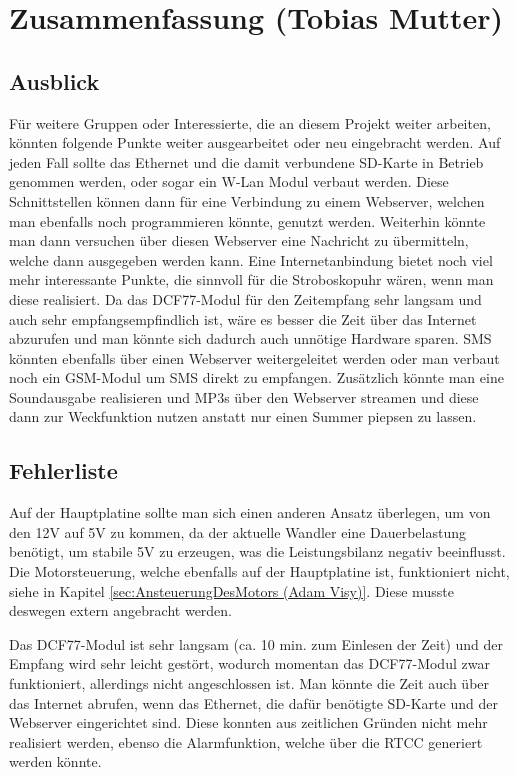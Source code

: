 \chapter{Zusammenfassung (Tobias Mutter)}

\section{Ausblick}

Für weitere Gruppen oder Interessierte, die an diesem Projekt weiter arbeiten, könnten folgende Punkte weiter ausgearbeitet oder neu eingebracht werden. Auf jeden Fall sollte das Ethernet und die damit verbundene SD-Karte in Betrieb genommen werden, oder sogar ein W-Lan Modul verbaut werden. Diese Schnittstellen können dann für eine Verbindung zu einem Webserver, welchen man ebenfalls noch programmieren könnte, genutzt werden. Weiterhin könnte man dann versuchen über diesen Webserver eine Nachricht zu übermitteln, welche dann ausgegeben werden kann. Eine Internetanbindung bietet noch viel mehr interessante Punkte, die sinnvoll für die Stroboskopuhr wären, wenn man diese realisiert. Da das DCF77-Modul für den Zeitempfang sehr langsam und auch sehr empfangsempfindlich ist, wäre es besser die Zeit über das Internet abzurufen und man könnte sich dadurch auch unnötige Hardware sparen. SMS könnten ebenfalls über einen Webserver weitergeleitet werden oder man verbaut noch ein GSM-Modul um SMS direkt zu empfangen. Zusätzlich könnte man eine Soundausgabe realisieren und MP3s über den Webserver streamen und diese dann zur Weckfunktion nutzen anstatt nur einen Summer piepsen zu lassen.
   

\section{Fehlerliste}

Auf der Hauptplatine sollte man sich einen anderen Ansatz überlegen, um von den 12V auf 5V zu kommen, da der aktuelle Wandler eine Dauerbelastung benötigt, um stabile 5V zu erzeugen, was die Leistungsbilanz negativ beeinflusst. Die Motorsteuerung, welche ebenfalls auf der Hauptplatine ist, funktioniert nicht, siehe in Kapitel \vref{sec:AnsteuerungDesMotors (Adam Visy)}. Diese musste deswegen extern angebracht werden. 

Das DCF77-Modul ist sehr langsam (ca. 10 min. zum Einlesen der Zeit) und der Empfang wird sehr leicht gestört, wodurch momentan das DCF77-Modul zwar funktioniert, allerdings nicht angeschlossen ist. Man könnte die Zeit auch über das Internet abrufen, wenn das Ethernet, die dafür benötigte SD-Karte und der Webserver eingerichtet sind. Diese konnten aus zeitlichen Gründen nicht mehr realisiert werden, ebenso die Alarmfunktion, welche über die RTCC generiert werden könnte.
